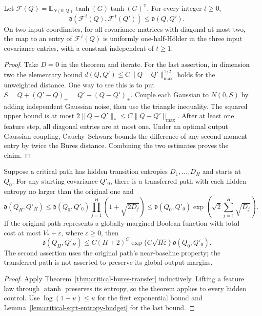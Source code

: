 \begin{corollary}
\label{cor:critical-free-bures-nonexpansion}
Let $\mathcal F(Q)=\mathbb E_{N(0,Q)}\tanh(G)\tanh(G)^{\mathsf T}$.
For every integer $t\ge0$,
\[
 \mathfrak d(\mathcal F^{\,t}(Q),\mathcal F^{\,t}(Q'))
 \le \mathfrak d(Q,Q').
\]
On two input coordinates, for all covariance matrices with diagonal
at most two, the map to an entry of $\mathcal F^{\,t}(Q)$ is
uniformly one-half-H\"older in the three input covariance entries,
with a constant independent of $t\ge1$.
\end{corollary}

\begin{proof}
Take $D=0$ in the theorem and iterate. For the last assertion, in
dimension two the elementary bound
$d(Q,Q')\le C\|Q-Q'\|_{\max}^{1/2}$ holds for the unweighted
distance. One way to see this is to put
$S=Q+(Q'-Q)_+=Q'+(Q-Q')_+$. Couple each Gaussian to $N(0,S)$ by
adding independent Gaussian noise, then use the triangle inequality.
The squared upper bound is at most
$2\|Q-Q'\|_*\le C\|Q-Q'\|_{\max}$.
After at least one feature step, all diagonal entries are at most
one. Under an optimal output Gaussian coupling, Cauchy--Schwarz
bounds the difference of any second-moment entry by twice the Bures
distance. Combining the two estimates proves the claim.
\end{proof}

\begin{corollary}
\label{cor:critical-near-baseline-bures-stability}
Suppose a critical path has hidden transition entropies
$D_1,\ldots,D_H$ and starts at $Q_0$. For any starting covariance
$Q'_0$, there is a transferred path with each hidden entropy no
larger than the original one and
\[
 \mathfrak d(Q_H,Q'_H)
 \le \mathfrak d(Q_0,Q'_0)\prod_{j=1}^H(1+\sqrt{2D_j})
 \le \mathfrak d(Q_0,Q'_0)
       \exp\!\left(\sqrt2\sum_{j=1}^H\sqrt{D_j}\right).
\]
If the original path represents a globally margined Boolean function
with total cost at most $V_*+\varepsilon$, where $\varepsilon\ge0$, then
\[
 \mathfrak d(Q_H,Q'_H)
 \le C(H+2)^C\exp\{C\sqrt{H\varepsilon}\}\,\mathfrak d(Q_0,Q'_0).
\]
The second assertion uses the original path's near-baseline
property; the transferred path is not asserted to preserve its
global output margins.
\end{corollary}

\begin{proof}
Apply Theorem~\ref{thm:critical-bures-transfer} inductively. Lifting
a feature law through $\operatorname{atanh}$ preserves its entropy,
so the theorem applies to every hidden control. Use
$\log(1+u)\le u$ for the first exponential bound and
Lemma~\ref{lem:critical-sqrt-entropy-budget} for the last bound.
\end{proof}

